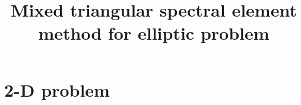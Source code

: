 \documentclass[10pt,reqno, final]{amsart}
\newcommand{\bs}[1]{\boldsymbol{#1}}
\begin{document}

\graphicspath{{./figs/}}
\baselineskip 13pt
\title{Mixed triangular spectral element method for elliptic problem}
\maketitle
\section{2-D problem}
\end{document}
